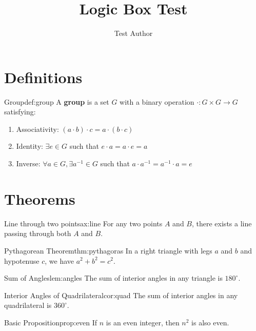 \documentclass[12pt]{article}
\title{Logic Box Test}
\author{Test Author}
\begin{document}
\maketitle

\section{Definitions}

\begin{definition}{Group}{def:group}
A \textbf{group} is a set $G$ with a binary operation $\cdot: G \times G \to G$ satisfying:
\begin{enumerate}
    \item Associativity: $(a \cdot b) \cdot c = a \cdot (b \cdot c)$
    \item Identity: $\exists e \in G$ such that $e \cdot a = a \cdot e = a$
    \item Inverse: $\forall a \in G, \exists a^{-1} \in G$ such that $a \cdot a^{-1} = a^{-1} \cdot a = e$
\end{enumerate}
\end{definition}

\section{Theorems}

\begin{axiom}{Line through two points}{ax:line}
For any two points $A$ and $B$, there exists a line passing through both $A$ and $B$.
\end{axiom}

\begin{theorem}{Pythagorean Theorem}{thm:pythagoras}
In a right triangle with legs $a$ and $b$ and hypotenuse $c$, we have $a^2 + b^2 = c^2$.
\end{theorem}

\begin{lemma}{Sum of Angles}{lem:angles}
The sum of interior angles in any triangle is $180^\circ$.
\end{lemma}

\begin{corollary}{Interior Angles of Quadrilateral}{cor:quad}
The sum of interior angles in any quadrilateral is $360^\circ$.
\end{corollary}

\begin{proposition}{Basic Proposition}{prop:even}
If $n$ is an even integer, then $n^2$ is also even.
\end{proposition}
\end{document}
